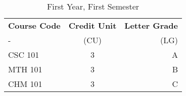 \documentclass{article}
\begin{document}
	\begin{table}[h!]
		\begin{center}
			\caption{First Year, First Semester}
			\label{tab:table1}
			\begin{tabular}{l|c|r}
				\textbf{Course Code} & \textbf{Credit Unit} &
				\textbf{Letter Grade}\\
				-& (CU) & (LG) \\
				\hline
				CSC 101 & 3 & A\\
				MTH 101 & 3 & B\\
				CHM 101 & 3 & C\\
			\end{tabular}
		\end{center}
	\end{table}
\end{document}
